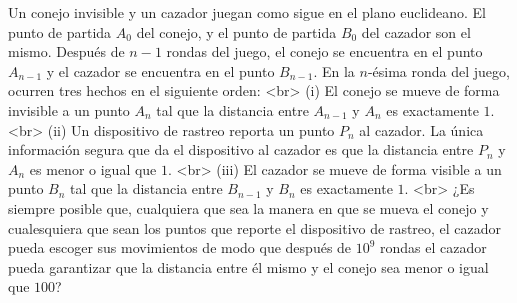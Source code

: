 Un conejo invisible y un cazador juegan como sigue en el plano euclideano. El punto de partida $A_0$ del conejo, y el punto de partida $B_0$ del cazador son el mismo. Después de $n−1$ rondas del juego, el conejo se encuentra en el punto $A_{n−1}$ y el cazador se encuentra en el punto $B_{n−1}$. En la $n$-ésima ronda del juego, ocurren tres hechos en el siguiente orden: <br>
(i) El conejo se mueve de forma invisible a un punto $A_n$ tal que la distancia entre $A_{n−1}$ y $A_n$ es exactamente $1$. <br>
(ii) Un dispositivo de rastreo reporta un punto $P_n$ al cazador. La única información segura que da el dispositivo al cazador es que la distancia entre $P_n$ y $A_n$ es menor o igual que $1$. <br>
(iii) El cazador se mueve de forma visible a un punto $B_n$ tal que la distancia entre $B_{n−1}$ y $B_n$ es exactamente $1$. <br>
¿Es siempre posible que, cualquiera que sea la manera en que se mueva el conejo y cualesquiera que sean los puntos que reporte el dispositivo de rastreo, el cazador pueda escoger sus movimientos de modo que después de $10^9$ rondas el cazador pueda garantizar que la distancia entre él mismo y el conejo sea menor o igual que $100$?